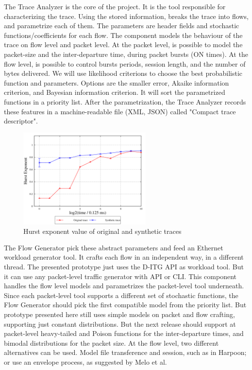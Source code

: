 The Trace Analyzer is the core of the project. It is the tool responsible for characterizing the trace. Using the stored information, breaks the trace into flows, and parametrize each of them.  The parameters are  header fields and stochastic functions/coefficients for each flow. The component models the behaviour of the trace on flow level and packet level. At the packet level, is possible to model the packet-size and the inter-departure time, during packet bursts (ON times). At the flow level, is possible to control bursts periods, session length,  and the number of bytes delivered. We will use likelihood criterions to choose the best probabilistic function and parameters. Options are the smaller error, Akaike information criterion, and Bayesian information criterion\cite{sourcesOnOff-paper}. It will sort the parametrized functions in a priority list. After the parametrization, the Trace Analyzer records these features in a machine-readable file (XML, JSON) called "Compact trace descriptor".  %

\begin{figure}[H]
        {\centering
        \includegraphics[height=50mm]{figures/qualification-HustExponent.png}
        \caption{Hurst exponent value of original and synthetic traces}
        \label{fig:hurst-exponent}\par}
\end{figure}

The Flow Generator pick these abstract parameters and feed an Ethernet workload generator tool. It crafts each flow in an independent way, in a different thread. The presented prototype just uses the D-ITG API as workload tool.  But it can use any packet-level traffic generator with API or CLI. This component handles the flow level models and parametrizes the packet-level tool underneath. Since each packet-level tool supports a different set of stochastic functions, the Flow Generator should pick the first compatible model from the priority list. But prototype presented here still uses simple models on packet and flow crafting, supporting just constant distributions. But the next release should support at packet-level heavy-tailed\cite{sourcesOnOff-paper} and Poison functions for the inter-departure times, and  bimodal distributions\cite{packet-distribution-model}\cite{udp-flows-model} for the packet size. At the flow level, two different alternatives can be used. Model file transference and session,  such as in Harpoon\cite{harpoon-paper}; or use an envelope process, as suggested by Melo et al\cite{envelope-process-equivalent-bandwidth}.



